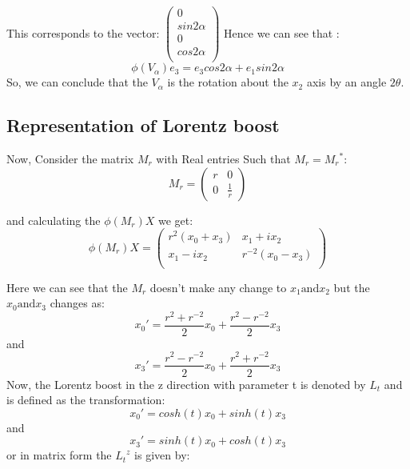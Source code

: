 This corresponds to the vector:
$
\begin{pmatrix}
0\\
sin2\alpha\\
0\\
cos2\alpha\\
\end{pmatrix}
$
Hence we can see that :
\begin{equation}
   \phi(V_{\alpha})e_3=e_3 cos2\alpha + e_1 sin2\alpha 
\end{equation}
So, we can conclude that the $V_{\alpha}$ is the rotation about the $x_2$ axis by an angle $2\theta$.





\subsection{Representation of Lorentz boost}
Now, Consider the matrix $M_r$ with Real entries Such that $M_r={M_r}^{*}$:
\begin{equation}
    M_{r}=
    {
    \begin{pmatrix}
    r&0\\
    0&\frac{1}{r}
    \end{pmatrix}
    }
\end{equation}

and calculating the $\phi(M_{r})X$ we get:
\begin{equation}
    \phi(M_{r})X=
    \begin{pmatrix}
      r^{2}(x_0 + x_3) & x_1 +ix_2\\
      x_1 -ix_2 & r^{-2}(x_0 - x_3)\\
    \end{pmatrix}
\end{equation}

Here we can see that the $M_r$ doesn't make any change to $x_1 \text{and} x_2$ but the $x_0 \text{and} x_3$ changes as:
\begin{equation}
    x_0' = \frac{r^2 + r^{-2}}{2}x_0 + \frac{r^2 - r^{-2}}{2}x_3
\end{equation}
and
\begin{equation}
    x_3' = \frac{r^2 - r^{-2}}{2}x_0 + \frac{r^2 + r^{-2}}{2}x_3
\end{equation}
Now, the Lorentz boost  in the z direction with parameter t is denoted by $L_t$ and is defined as the transformation:
\begin{equation}
    x_0' = cosh(t)x_0 + sinh(t)x_3
\end{equation}
and
\begin{equation}
    x_3' = sinh(t)x_0 + cosh(t)x_3
\end{equation}
or in matrix form the ${L_t}^z$ is given by:

